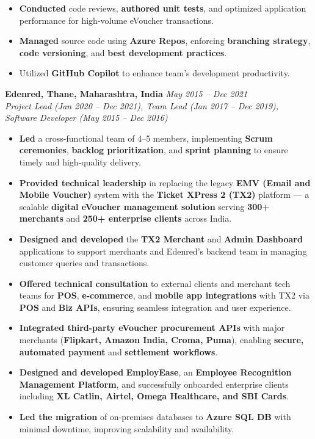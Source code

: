 \documentclass[12pt,a4paper]{article}
\begin{document}
\begin{itemize}
    \item \textbf{Conducted} code reviews, \textbf{authored unit tests}, and optimized application performance for high-volume eVoucher transactions.
    \item \textbf{Managed} source code using \textbf{Azure Repos}, enforcing \textbf{branching strategy}, \textbf{code versioning}, and \textbf{best development practices}. 
    \item Utilized \textbf{GitHub Copilot} to enhance team's development productivity.
\end{itemize}

\textbf{Edenred, Thane, Maharashtra, India} \hfill \textit{May 2015 -- Dec 2021}\\
\textit{Project Lead (Jan 2020 -- Dec 2021), \newline Team Lead (Jan 2017 -- Dec 2019), \newline Software Developer (May 2015 -- Dec 2016)}
\begin{itemize}
    \item \textbf{Led} a cross-functional team of 4–5 members, implementing \textbf{Scrum ceremonies}, \textbf{backlog prioritization}, and \textbf{sprint planning} to ensure timely and high-quality delivery.
    \item \textbf{Provided technical leadership} in replacing the legacy \textbf{EMV (Email and Mobile Voucher)} system with the \textbf{Ticket XPress 2 (TX2)} platform — a scalable \textbf{digital eVoucher management solution} serving \textbf{300+ merchants} and \textbf{250+ enterprise clients} across India.
    \item \textbf{Designed and developed} the \textbf{TX2 Merchant} and \textbf{Admin Dashboard} applications to support merchants and Edenred’s backend team in managing customer queries and transactions.
    \item \textbf{Offered technical consultation} to external clients and merchant tech teams for \textbf{POS}, \textbf{e-commerce}, and \textbf{mobile app integrations} with TX2 via \textbf{POS} and \textbf{Biz APIs}, ensuring seamless integration and user experience.
    \item \textbf{Integrated third-party eVoucher procurement APIs} with major merchants (\textbf{Flipkart, Amazon India, Croma, Puma}), enabling \textbf{secure, automated payment} and \textbf{settlement workflows}.
    \item \textbf{Designed and developed} \textbf{EmployEase}, an \textbf{Employee Recognition Management Platform}, and successfully onboarded enterprise clients including \textbf{XL Catlin, Airtel, Omega Healthcare, and SBI Cards}.
    \item \textbf{Led the migration} of on-premises databases to \textbf{Azure SQL DB} with minimal downtime, improving scalability and availability.
\end{itemize}
\end{document}
